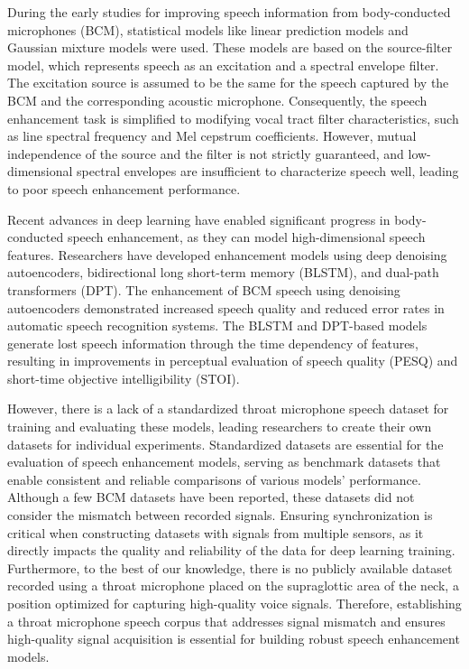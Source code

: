 \documentclass[10pt]{wlscirep}
\begin{document}
During the early studies for improving speech information from body-conducted microphones (BCM), statistical models like linear prediction models\cite{vu2007blind, rahman2017lp} and Gaussian mixture models\cite{nakagiri2006improving, toda2012statistical, turan2015source} were used. These models are based on the source-filter model, which represents speech as an excitation and a spectral envelope filter. The excitation source is assumed to be the same for the speech captured by the BCM and the corresponding acoustic microphone. Consequently, the speech enhancement task is simplified to modifying vocal tract filter characteristics, such as line spectral frequency and Mel cepstrum coefficients. However, mutual independence of the source and the filter is not strictly guaranteed, and low-dimensional spectral envelopes are insufficient to characterize speech well, leading to poor speech enhancement performance.

Recent advances in deep learning have enabled significant progress in body-conducted speech enhancement, as they can model high-dimensional speech features. Researchers have developed enhancement models using deep denoising autoencoders\cite{huang2017wearable, liu2018bone}, bidirectional long short-term memory (BLSTM)\cite{zheng2018novel, gao2022comparison}, and dual-path transformers (DPT)\cite{zheng2022dual}. The enhancement of BCM speech using denoising autoencoders demonstrated increased speech quality and reduced error rates in automatic speech recognition systems. The BLSTM and DPT-based models generate lost speech information through the time dependency of features, resulting in improvements in perceptual evaluation of speech quality (PESQ) and short-time objective intelligibility (STOI).

However, there is a lack of a standardized throat microphone speech dataset for training and evaluating these models, leading researchers to create their own datasets for individual experiments\cite{zheng2018novel, zheng2022dual, huang2017wearable, liu2018bone, gao2022comparison}. Standardized datasets are essential for the evaluation of speech enhancement models, serving as benchmark datasets that enable consistent and reliable comparisons of various models' performance\cite{vctk, librivox, Chung18voxceleb2, audioset, demand, freesound}. Although a few BCM datasets have been reported\cite{ESMB, ABCS, Vibravox}, these datasets did not consider the mismatch between recorded signals. Ensuring synchronization is critical when constructing datasets with signals from multiple sensors, as it directly impacts the quality and reliability of the data for deep learning training. Furthermore, to the best of our knowledge, there is no publicly available dataset recorded using a throat microphone placed on the supraglottic area of the neck, a position optimized for capturing high-quality voice signals\cite{song2021study}. Therefore, establishing a throat microphone speech corpus that addresses signal mismatch and ensures high-quality signal acquisition is essential for building robust speech enhancement models.
\end{document}

